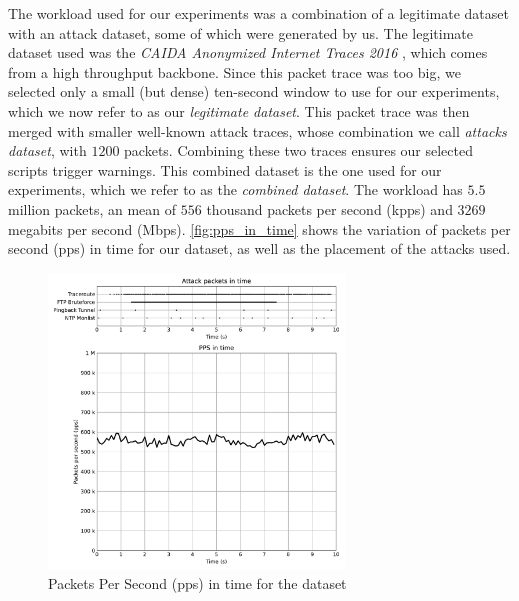 The workload used for our experiments was a combination of a legitimate dataset with an attack dataset, some of which were generated by us. The legitimate dataset used was the \textit{CAIDA Anonymized Internet Traces 2016} \cite{CAIDA2016}, which comes from a high throughput backbone. Since this packet trace was too big, we selected only a small (but dense) ten-second window to use for our experiments, which we now refer to as our \textit{legitimate dataset}. This packet trace was then merged with smaller well-known attack traces, whose combination we call \textit{attacks dataset}, with $1200$ packets. Combining these two traces ensures our selected scripts trigger warnings. This combined dataset is the one used for our experiments, which we refer to as the \textit{combined dataset}. The workload has $5.5$ million packets, an mean of $556$ thousand packets per second (kpps) and $3269$ megabits per second (Mbps). \autoref{fig:pps_in_time} shows the variation of packets per second (pps) in time for our dataset, as well as the placement of the attacks used.

\begin{figure}[htb]
    \caption{Packets Per Second (pps) in time for the dataset}
    \begin{center}
        \includegraphics[width=0.7\textwidth]{images/pps_in_time.pdf}  
    \end{center}
    \label{fig:pps_in_time}
\end{figure}




